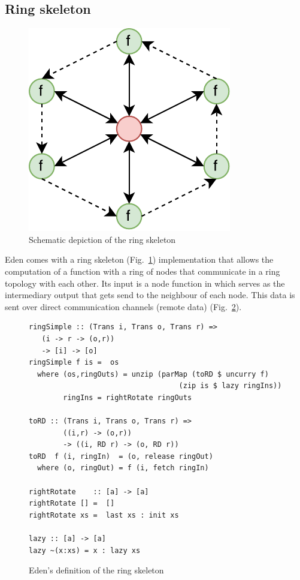\subsection{Ring skeleton} \label{sec:ring}
\begin{figure}[h]
	\includegraphics[scale=0.75]{images/ring}
	\caption{Schematic depiction of the ring skeleton}
	\label{fig:ringImg}
\end{figure}
Eden comes with a ring skeleton (Fig.~\ref{fig:ringImg}) implementation that allows the computation of a function \code{[i] -> [o]} with a ring of nodes that communicate in a ring topology with each other. Its input is a node function  in which  serves as the intermediary output that gets send to the neighbour of each node. This data is sent over direct communication channels (remote data) (Fig.~\ref{fig:ringEden}).
\begin{figure}[h]
\begin{lstlisting}[frame=htrbl]
ringSimple :: (Trans i, Trans o, Trans r) =>
   (i -> r -> (o,r))
   -> [i] -> [o]
ringSimple f is =  os
  where (os,ringOuts) = unzip (parMap (toRD $ uncurry f)
                                   (zip is $ lazy ringIns))
        ringIns = rightRotate ringOuts

toRD :: (Trans i, Trans o, Trans r) => 
        ((i,r) -> (o,r))
        -> ((i, RD r) -> (o, RD r))
toRD  f (i, ringIn)  = (o, release ringOut)
  where (o, ringOut) = f (i, fetch ringIn)

rightRotate    :: [a] -> [a]
rightRotate [] =  []
rightRotate xs =  last xs : init xs

lazy :: [a] -> [a]
lazy ~(x:xs) = x : lazy xs
\end{lstlisting}
\caption{Eden's definition of the ring skeleton \citep{eden_skel_topology}}
\label{fig:ringEden}
\end{figure}


